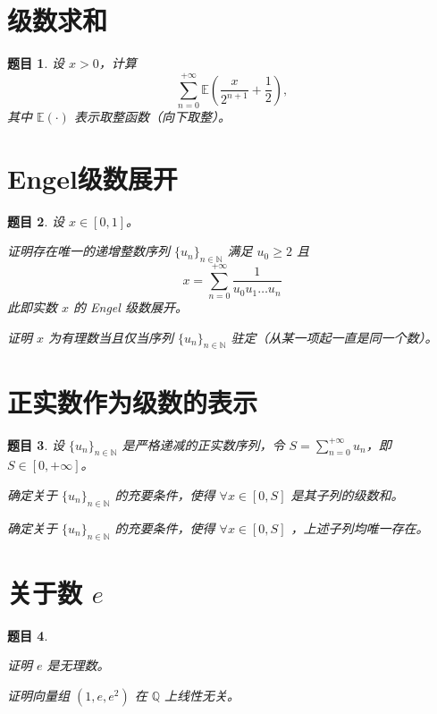 \documentclass[12pt,UTF8]{ctexbook}
\theoremstyle{exercisestyle}
\newtheorem*{exercise}{题目}
\theoremstyle{solutionstyle}
\begin{document}
\section{级数求和}\label{calcul-dune-somme}
\begin{exercise}
设 $x > 0$，计算  
$$
\sum_{n=0}^{+\infty} \mathbb{E}\left(\frac{x}{2^{n+1}} + \frac{1}{2}\right),
$$  
其中 $\mathbb{E}(\cdot)$ 表示取整函数（向下取整）。
\end{exercise}

\section{Engel级数展开}
\begin{exercise}
设 $x \in [0,1]$。  
\begin{subquestions}
  \item 证明存在唯一的递增整数序列 $\{u_n\}_{n\in\mathbb{N}}$ 满足 $u_0 \geqslant 2$ 且  
  $$
  x = \sum_{n=0}^{+\infty} \frac{1}{u_0 u_1 \dots u_n}
  $$
  此即实数 $x$ 的 Engel 级数展开。  
  \item 证明 $x$ 为有理数当且仅当序列 $\{u_n\}_{n\in\mathbb{N}}$ 驻定（从某一项起一直是同一个数）。
\end{subquestions}
\end{exercise}

\section{正实数作为级数的表示}
\begin{exercise}
设 $\{u_n\}_{n\in\mathbb{N}}$ 是严格递减的正实数序列，令 $\displaystyle S = \sum_{n=0}^{+\infty} u_n$，即 $S \in [0, +\infty]$。

\begin{subquestions}
\item 确定关于 $\{u_n\}_{n\in\mathbb{N}}$ 的充要条件，使得 $\forall x \in [0, S]$ 是其子列的级数和。
\item 确定关于 $\{u_n\}_{n\in\mathbb{N}}$ 的充要条件，使得 $\forall x \in [0, S]$ ，上述子列均唯一存在。
\end{subquestions}

\end{exercise}

\section{关于数 $e$}
\begin{exercise}
  \begin{subquestions}
    \item 证明 $e$ 是无理数。
    \item 证明向量组 $(1, e, e^2)$ 在 $\mathbb{Q}$ 上线性无关。
  \end{subquestions}
\end{exercise}
\end{document}
